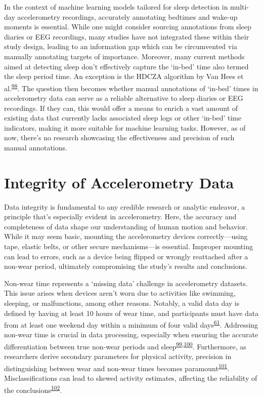\documentclass[
  10pt,
]{scrbook}
\begin{document}
In the context of machine learning models tailored for sleep detection
in multi-day accelerometry recordings, accurately annotating bedtimes
and wake-up moments is essential. While one might consider sourcing
annotations from sleep diaries or EEG recordings, many studies have not
integrated these within their study design, leading to an information
gap which can be circumvented via manually annotating targets of
importance. Moreover, many current methods aimed at detecting sleep
don't effectively capture the `in-bed' time also termed the sleep period
time. An exception is the HDCZA algorithm by Van Hees et
al.\textsuperscript{\protect\hyperlink{ref-van_hees_estimating_2018}{98}}.
The question then becomes whether manual annotations of `in-bed' times
in accelerometry data can serve as a reliable alternative to sleep
diaries or EEG recordings. If they can, this would offer a means to
enrich a vast amount of existing data that currently lacks associated
sleep logs or other `in-bed' time indicators, making it more suitable
for machine learning tasks. However, as of now, there's no research
showcasing the effectiveness and precision of such manual annotations.

\hypertarget{integrity-of-accelerometry-data}{%
\section{Integrity of Accelerometry
Data}\label{integrity-of-accelerometry-data}}

Data integrity is fundamental to any credible research or analytic
endeavor, a principle that's especially evident in accelerometry. Here,
the accuracy and completeness of data shape our understanding of human
motion and behavior. While it may seem basic, mounting the accelerometry
devices correctly---using tape, elastic belts, or other secure
mechanisms---is essential. Improper mounting can lead to errors, such as
a device being flipped or wrongly reattached after a non-wear period,
ultimately compromising the study's results and conclusions.

Non-wear time represents a `missing data' challenge in accelerometry
datasets. This issue arises when devices aren't worn due to activities
like swimming, sleeping, or malfunctions, among other reasons. Notably,
a valid data day is defined by having at least 10 hours of wear time,
and participants must have data from at least one weekend day within a
minimum of four valid
days\textsuperscript{\protect\hyperlink{ref-migueles_accelerometer_2017}{61}}.
Addressing non-wear time is crucial in data processing, especially when
ensuring the accurate differentiation between true non-wear periods and
sleep\textsuperscript{\protect\hyperlink{ref-choi_validation_2011}{99},\protect\hyperlink{ref-winkler_identifying_2016}{100}}.
Furthermore, as researchers derive secondary parameters for physical
activity, precision in distinguishing between wear and non-wear times
becomes
paramount\textsuperscript{\protect\hyperlink{ref-matthews_2002}{101}}.
Misclassifications can lead to skewed activity estimates, affecting the
reliability of the
conclusions\textsuperscript{\protect\hyperlink{ref-king_2011}{102}}.
\end{document}
